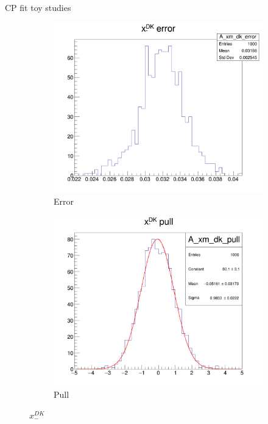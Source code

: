 \documentclass{beamer}
\begin{document}
\begin{frame}{CP fit toy studies}
\begin{figure}
\begin{subfigure}{0.25\textwidth}
    \end{subfigure}%
    \begin{subfigure}{0.25\textwidth}
      \includegraphics[width = 1.0\textwidth]{Plots/A_xm_dk_error.png}
      \caption{Error}
    \end{subfigure}%
    \begin{subfigure}{0.25\textwidth}
      \includegraphics[width = 1.0\textwidth]{Plots/A_xm_dk_pull.png}
      \caption{Pull}
    \end{subfigure}
    \caption{$x_-^{DK}$}
  \end{figure}
\end{frame}
\end{document}
